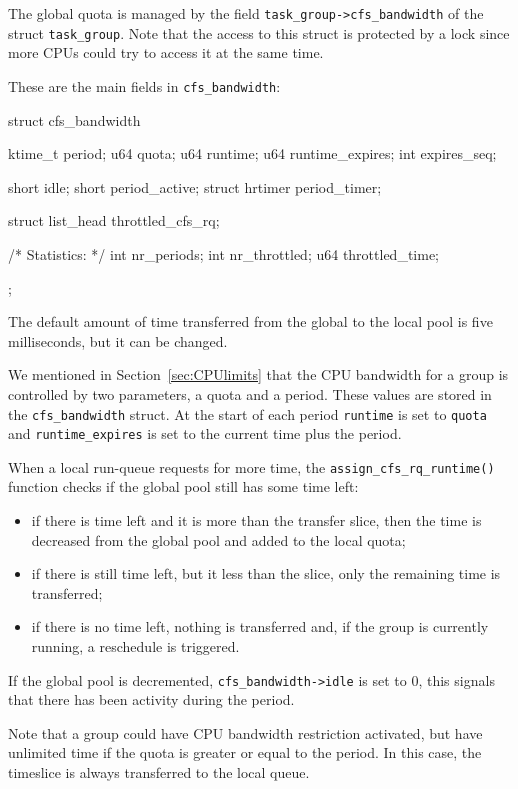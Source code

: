 The global quota is managed by the field
\verb|task_group->cfs_bandwidth| of the struct \verb|task_group|.
Note that the access to this struct is protected by a lock since more
CPUs could try to access it at the same time.

These are the main fields in \verb|cfs_bandwidth|:
\begin{code}
struct cfs_bandwidth {
	ktime_t			period;
	u64			quota;
	u64			runtime;
	u64			runtime_expires;
	int			expires_seq;
    
        short			idle;
	short			period_active;
	struct hrtimer		period_timer;
	
	struct list_head	throttled_cfs_rq;

	/* Statistics: */
	int			nr_periods;
	int			nr_throttled;
	u64			throttled_time;
};
\end{code}
The default amount of time transferred from the global to the local pool is five milliseconds, but it can be changed.

We mentioned in Section~\ref{sec:CPUlimits} that the CPU bandwidth for a group is controlled by two parameters, a quota and a period. These values are stored in the \verb|cfs_bandwidth| struct. At the start of each period \verb|runtime| is set to \verb|quota| and \verb|runtime_expires| is set to the current time plus the period.

When a local run-queue requests for more time, the \verb|assign_cfs_rq_runtime()| function checks if the global pool still has some time left:
\begin{itemize}
    \item if there is time left and it is more than the transfer slice, then the time is decreased from the global pool and added to the local quota;
    \item if there is still time left, but it less than the slice, only the remaining time is transferred;
    \item if there is no time left, nothing is transferred and, if the group is currently running, a reschedule is triggered.
\end{itemize}
If the global pool is decremented, \verb|cfs_bandwidth->idle| is set to 0, this signals that there has been activity during the period.

Note that a group could have CPU bandwidth restriction activated, but have unlimited time if the quota is greater or equal to the period. In this case, the timeslice is always transferred to the local queue.

